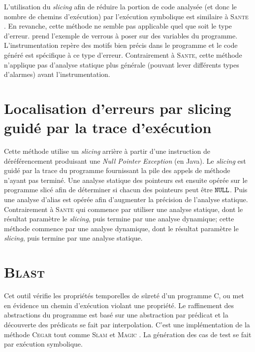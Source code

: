 L'utilisation du {\em slicing} afin de réduire la portion de code analysée
(et donc le nombre de chemins d'exécution) par l'exécution symbolique est
similaire à \textsc{Sante} \cite{SANTE}. En revanche, cette méthode ne semble
pas applicable quel que soit le type d'erreur.
\cite{checking-prop-state-machines} prend l'exemple de verrous à poser sur des
variables du programme. L'instrumentation repère des motifs bien précis dans le
programme et le code généré est spécifique à ce type d'erreur. Contrairement à
\textsc{Sante}, cette méthode n'applique pas d'analyse statique plus générale
(pouvant lever différents types d'alarmes) avant l'instrumentation.

\section{Localisation d'erreurs par slicing guidé par la trace d'exécution}

Cette méthode \cite{fault-localization} utilise un {\em slicing} arrière à
partir d'une instruction de déréférencement produisant une {\em Null Pointer
Exception} (en Java). Le {\em slicing} est guidé par la trace du programme
fournissant la pile des appels de méthode n'ayant pas terminé. Une analyse
statique des pointeurs est ensuite opérée sur le programme slicé afin de
déterminer si chacun des pointeurs peut être ${\tt NULL}$. Puis une analyse
d'alias est opérée afin d'augmenter la précision de l'analyse statique.\\

Contrairement à \textsc{Sante} \cite{SANTE} qui commence par utiliser une
analyse statique, dont le résultat paramètre le {\em slicing}, puis termine par
une analyse dynamique; cette méthode commence par une analyse dynamique, dont
le résultat paramètre le {\em slicing}, puis termine par une analyse statique.

\section{\textsc{Blast}}

Cet outil \cite{BLAST} vérifie les propriétés temporelles de sûreté d'un
programme C, ou met en évidence un chemin d'exécution violant une propriété. Le
raffinement des abstractions du programme est basé sur une abstraction par
prédicat et la découverte des prédicats se fait par interpolation. C'est une
implémentation de la méthode \textsc{Cegar} \cite{CEGAR} tout comme
\textsc{Slam} \cite{SLAM} et \textsc{Magic} \cite{MAGIC}. La génération des cas
de test se fait par exécution symbolique.\\

